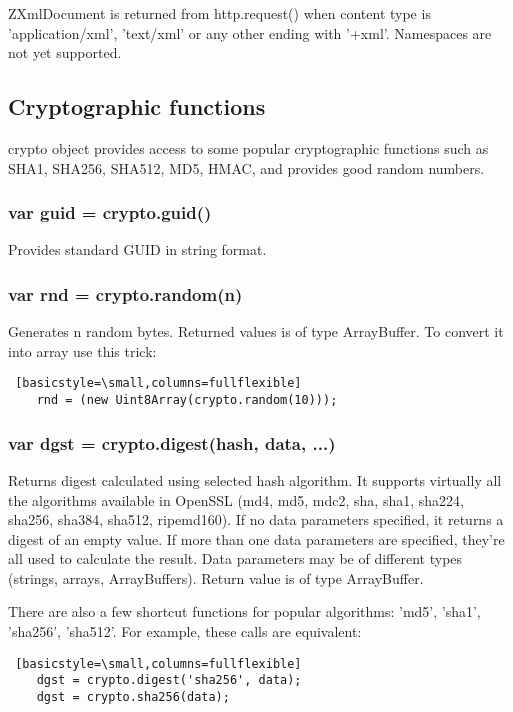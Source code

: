 ZXmlDocument is returned from http.request() when content type is 'application/xml', 
'text/xml' or any other ending with '+xml'. Namespaces are not yet supported.

\subsection{Cryptographic functions}

crypto object provides access to some popular cryptographic functions such
as SHA1, SHA256, SHA512, MD5, HMAC, and provides good random numbers.

\subsubsection{var guid = crypto.guid()}
Provides standard GUID in string format.

\subsubsection{var rnd = crypto.random(n)}
Generates n random bytes.
Returned values is of type ArrayBuffer. To convert it into array use this trick:

\begin{lstlisting} [basicstyle=\small,columns=fullflexible]
	rnd = (new Uint8Array(crypto.random(10)));
\end{lstlisting}

\subsubsection{var dgst = crypto.digest(hash, data, ...)}
Returns digest calculated using selected hash algorithm. It supports virtually all the 
algorithms available in OpenSSL (md4, md5, mdc2, sha, sha1, sha224, sha256, sha384, sha512, ripemd160).
If no data parameters specified, it returns a digest of an empty value. If more than one 
data parameters are specified, they're all used to calculate the result. Data parameters 
may be of different types (strings, arrays, ArrayBuffers).
Return value is of type ArrayBuffer.

There are also a few shortcut functions for popular algorithms: 'md5', 'sha1', 'sha256', 
'sha512'. For example, these calls are equivalent:

\begin{lstlisting} [basicstyle=\small,columns=fullflexible]
	dgst = crypto.digest('sha256', data);
	dgst = crypto.sha256(data);
\end{lstlisting}

